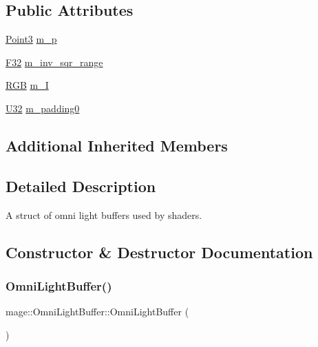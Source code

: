 \subsection*{Public Attributes}
\begin{DoxyCompactItemize}
\item 
\hyperlink{structmage_1_1_point3}{Point3} \hyperlink{structmage_1_1_omni_light_buffer_a777b98a686a7e39bd7b401748629d9fc}{m\+\_\+p}
\item 
\hyperlink{namespacemage_aa97e833b45f06d60a0a9c4fc22ae02c0}{F32} \hyperlink{structmage_1_1_omni_light_buffer_a156d844a76bb2a98859263128740a95b}{m\+\_\+inv\+\_\+sqr\+\_\+range}
\item 
\hyperlink{structmage_1_1_r_g_b}{R\+GB} \hyperlink{structmage_1_1_omni_light_buffer_a795c9e5f251fb30ec8b0896062b020a7}{m\+\_\+I}
\item 
\hyperlink{namespacemage_a41c104c036fba3756a74e19f793eeaa1}{U32} \hyperlink{structmage_1_1_omni_light_buffer_af75a020722cd8eb37b91fe42a5b0ad5c}{m\+\_\+padding0}
\end{DoxyCompactItemize}
\subsection*{Additional Inherited Members}


\subsection{Detailed Description}
A struct of omni light buffers used by shaders. 

\subsection{Constructor \& Destructor Documentation}
\hypertarget{structmage_1_1_omni_light_buffer_a2cb95cb8ba07182d04b610b1c4c49be1}{}\label{structmage_1_1_omni_light_buffer_a2cb95cb8ba07182d04b610b1c4c49be1} 
\subsubsection{\texorpdfstring{Omni\+Light\+Buffer()}{OmniLightBuffer()}\hspace{0.1cm}{\footnotesize\ttfamily [1/3]}}
{\footnotesize\ttfamily mage\+::\+Omni\+Light\+Buffer\+::\+Omni\+Light\+Buffer (\begin{DoxyParamCaption}{ }\end{DoxyParamCaption})}


